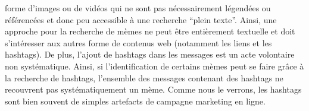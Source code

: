 forme d{\textquoteright}images ou de vid\'eos qui ne sont pas
n\'ecessairement l\'egend\'ees ou r\'ef\'erenc\'ees et donc peu
accessible \`a une recherche {\textquotedblleft}plein
texte{\textquotedblright}. Ainsi, une approche pour la recherche de
m\`emes ne peut \^etre enti\`erement textuelle et doit
s{\textquoteright}int\'eresser aux autres forme de contenus web
(notamment les liens et les hashtags). De plus, l{\textquoteright}ajout
de hashtags dans les messages est un acte volontaire non
syst\'ematique. Ainsi, si l{\textquoteright}identification de certains
m\`emes peut se faire gr\^ace \`a la recherche de hashtags,
l{\textquoteright}ensemble des messages contenant des hashtags ne
recouvrent pas syst\'ematiquement un m\`eme. Comme nous le verrons, les
hashtags sont bien souvent de simples artefacts de campagne marketing
en ligne.



